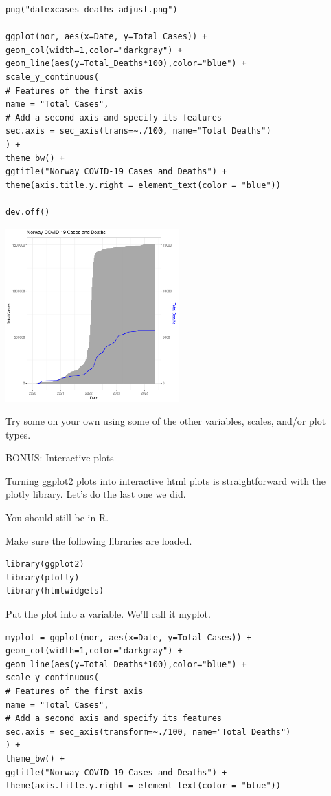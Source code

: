 \documentclass[
]{book}
\begin{document}
\begin{verbatim}
png("datexcases_deaths_adjust.png")

ggplot(nor, aes(x=Date, y=Total_Cases)) +
geom_col(width=1,color="darkgray") +
geom_line(aes(y=Total_Deaths*100),color="blue") +
scale_y_continuous(
# Features of the first axis
name = "Total Cases",
# Add a second axis and specify its features
sec.axis = sec_axis(trans=~./100, name="Total Deaths")
) +
theme_bw() +
ggtitle("Norway COVID-19 Cases and Deaths") +
theme(axis.title.y.right = element_text(color = "blue"))

dev.off()
\end{verbatim}

\includegraphics[width=0.5\textwidth,height=\textheight]{./Figures/datexcases_deaths_adjust.png}

Try some on your own using some of the other variables, scales, and/or plot types.

BONUS: Interactive plots

Turning ggplot2 plots into interactive html plots is straightforward with the plotly library. Let's do the last one we did.

You should still be in R.

Make sure the following libraries are loaded.

\begin{verbatim}
library(ggplot2)
library(plotly)
library(htmlwidgets)
\end{verbatim}

Put the plot into a variable. We'll call it myplot.

\begin{verbatim}
myplot = ggplot(nor, aes(x=Date, y=Total_Cases)) +
geom_col(width=1,color="darkgray") +
geom_line(aes(y=Total_Deaths*100),color="blue") +
scale_y_continuous(
# Features of the first axis
name = "Total Cases",
# Add a second axis and specify its features
sec.axis = sec_axis(transform=~./100, name="Total Deaths")
) +
theme_bw() +
ggtitle("Norway COVID-19 Cases and Deaths") +
theme(axis.title.y.right = element_text(color = "blue"))
\end{verbatim}
\end{document}
